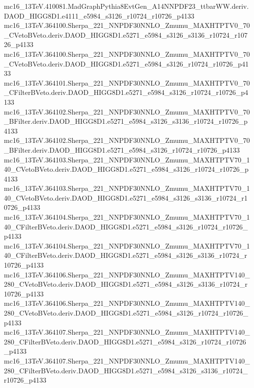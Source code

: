 \begin{scriptsize}
mc16\_13TeV.410081.MadGraphPythia8EvtGen\_A14NNPDF23\_ttbarWW.deriv.DAOD\_HIGG8D1.e4111\_e5984\_s3126\_r10724\_r10726\_p4133 \\
mc16\_13TeV.364100.Sherpa\_221\_NNPDF30NNLO\_Zmumu\_MAXHTPTV0\_70\_CVetoBVeto.deriv.DAOD\_HIGG8D1.e5271\_e5984\_s3126\_s3136\_r10724\_r10726\_p4133 \\
mc16\_13TeV.364100.Sherpa\_221\_NNPDF30NNLO\_Zmumu\_MAXHTPTV0\_70\_CVetoBVeto.deriv.DAOD\_HIGG8D1.e5271\_e5984\_s3126\_r10724\_r10726\_p4133 \\
mc16\_13TeV.364101.Sherpa\_221\_NNPDF30NNLO\_Zmumu\_MAXHTPTV0\_70\_CFilterBVeto.deriv.DAOD\_HIGG8D1.e5271\_e5984\_s3126\_r10724\_r10726\_p4133 \\
mc16\_13TeV.364102.Sherpa\_221\_NNPDF30NNLO\_Zmumu\_MAXHTPTV0\_70\_BFilter.deriv.DAOD\_HIGG8D1.e5271\_e5984\_s3126\_s3136\_r10724\_r10726\_p4133 \\
mc16\_13TeV.364102.Sherpa\_221\_NNPDF30NNLO\_Zmumu\_MAXHTPTV0\_70\_BFilter.deriv.DAOD\_HIGG8D1.e5271\_e5984\_s3126\_r10724\_r10726\_p4133 \\
mc16\_13TeV.364103.Sherpa\_221\_NNPDF30NNLO\_Zmumu\_MAXHTPTV70\_140\_CVetoBVeto.deriv.DAOD\_HIGG8D1.e5271\_e5984\_s3126\_r10724\_r10726\_p4133 \\
mc16\_13TeV.364103.Sherpa\_221\_NNPDF30NNLO\_Zmumu\_MAXHTPTV70\_140\_CVetoBVeto.deriv.DAOD\_HIGG8D1.e5271\_e5984\_s3126\_s3136\_r10724\_r10726\_p4133 \\
mc16\_13TeV.364104.Sherpa\_221\_NNPDF30NNLO\_Zmumu\_MAXHTPTV70\_140\_CFilterBVeto.deriv.DAOD\_HIGG8D1.e5271\_e5984\_s3126\_r10724\_r10726\_p4133 \\
mc16\_13TeV.364104.Sherpa\_221\_NNPDF30NNLO\_Zmumu\_MAXHTPTV70\_140\_CFilterBVeto.deriv.DAOD\_HIGG8D1.e5271\_e5984\_s3126\_s3136\_r10724\_r10726\_p4133 \\
mc16\_13TeV.364106.Sherpa\_221\_NNPDF30NNLO\_Zmumu\_MAXHTPTV140\_280\_CVetoBVeto.deriv.DAOD\_HIGG8D1.e5271\_e5984\_s3126\_s3136\_r10724\_r10726\_p4133 \\
mc16\_13TeV.364106.Sherpa\_221\_NNPDF30NNLO\_Zmumu\_MAXHTPTV140\_280\_CVetoBVeto.deriv.DAOD\_HIGG8D1.e5271\_e5984\_s3126\_r10724\_r10726\_p4133 \\
mc16\_13TeV.364107.Sherpa\_221\_NNPDF30NNLO\_Zmumu\_MAXHTPTV140\_280\_CFilterBVeto.deriv.DAOD\_HIGG8D1.e5271\_e5984\_s3126\_r10724\_r10726\_p4133 \\
mc16\_13TeV.364107.Sherpa\_221\_NNPDF30NNLO\_Zmumu\_MAXHTPTV140\_280\_CFilterBVeto.deriv.DAOD\_HIGG8D1.e5271\_e5984\_s3126\_s3136\_r10724\_r10726\_p4133 \\

\end{scriptsize}
